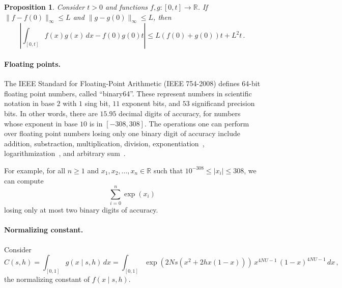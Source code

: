 \documentclass[a4paper,11pt]{article}
\makeatletter
\newcommand{\RR}{\mathbb{R}}
\newcommand{\1}{\mathds{1}}
\theoremstyle{plain} %
\newtheorem{Proposition}[@theorem]{Proposition}
\theoremstyle{definition} %
\theoremstyle{remark} %
\makeatother
\begin{document}
\begin{Proposition}
	Consider $t > 0$ and functions $f, g \colon [0, t] \to \RR$.
	If $\| f - f(0)\|_\infty \le L$ and $\| g - g(0)\|_\infty \le L$, then
	\[
		\left| \int_{[0, t]} f(x) g(x) \, dx - f(0) g(0) t \right| \le L ( f(0) + g(0) ) t + L^2 t \,.
	\]
\end{Proposition}

%



\paragraph{Floating points.}
The IEEE Standard for Floating-Point Arithmetic (IEEE 754-2008) defines 64-bit floating point numbers, called ``binary64''.
These represent numbers in scientific notation in base $2$ with $1$ sing bit, $11$ exponent bits, and $53$ significand precision bits.
In other words, there are $15.95$ decimal digits of accuracy, for numbers whose exponent in base $10$ is in $[-308, 308]$.
The operations one can perform over floating point numbers losing only one binary digit of accuracy include addition, substraction, multiplication, division, exponentiation~\cite{goldberg1991WhatEveryComputer, tang1989TabledrivenImplementationExponential}, logarithmization~\cite{dedinechin2007FastCorrectlyRounded, lemaire2016ComputingFloatingpointLogarithms}, and arbitrary sum~\cite{zhu2010Algorithm908Online}.

For example, for all $n \ge 1$ and $x_1, x_2, \ldots, x_n \in \RR$ such that $10^{-308} \le |x_i| \le 308$, we can compute
\[
	\sum_{i = 0}^{n} \exp(x_i)
\]
losing only at most two binary digits of accuracy.



\paragraph{Normalizing constant.}
Consider 
\[
	C(s, h) 
		= \int_{[0, 1]} g(x \mid s, h) \,dx 
		= \int_{[0, 1]} \exp(2N s ( x^2 + 2h x (1 - x) ) ) \, x^{4 N U - 1} \, (1 - x)^{4 N U - 1} \, dx \,,
\]
the normalizing constant of $f(x \mid s, h)$.
\end{document}
